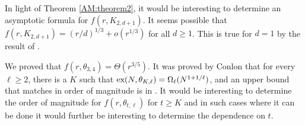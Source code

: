 \documentclass[12pt]{article}%
\newtheorem{conjecture}[theorem]{Conjecture}
\begin{document}
In light of Theorem \ref{AM:theorem2}, it would be interesting to determine an asymptotic formula for $f(r , K_{2,d+1})$.  It seems possible that $f(r, K_{2,d+1}) = (r/d)^{1/3} + o(r^{1/3})$ for all $d \geq 1$.  This is true for $d= 1$ by the result of \cite{Taranchuk2024}.     

We proved that $f(r, \theta_{3,4}) = \Theta ( r^{3/5})$.
It was proved by Conlon \cite{Conlon} that 
for every $\ell \geq 2$, there is a $K$ such that 
$\textup{ex}(N , \theta_{K , \ell} ) = \Omega_\ell ( N^{1 + 1/\ell})$, and an upper bound that matches in order of magnitude is in \cite{FS}.  It would be interesting to determine the order of magnitude for $f( r, \theta_{t , \ell})$ for $t\geq K$ and in such cases where it can be done it would further be interesting to determine the dependence on $t$.%

\end{document}
